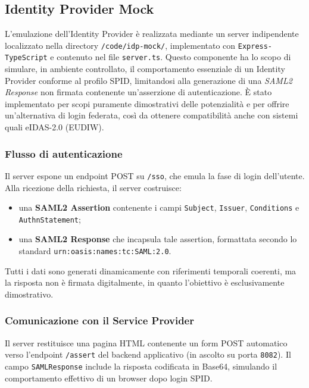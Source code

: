         \subsection{Identity Provider Mock}
            L'emulazione dell’Identity Provider è realizzata mediante un server indipendente localizzato nella directory \lstinline{/code/idp-mock/}, implementato con \texttt{Express-TypeScript} e contenuto nel file \texttt{server.ts}. Questo componente ha lo scopo di simulare, in ambiente controllato, il comportamento essenziale di un Identity Provider conforme al profilo SPID, limitandosi alla generazione di una \textit{SAML2 Response} non firmata contenente un'asserzione di autenticazione.
            È stato implementato per scopi puramente dimostrativi delle potenzialità e per offrire un'alternativa di login federata, così da ottenere compatibilità anche con sistemi quali eIDAS-2.0 (EUDIW).
            
            \subsubsection{Flusso di autenticazione}
                \noindent Il server espone un endpoint POST su \texttt{/sso}, che emula la fase di login dell'utente. Alla ricezione della richiesta, il server costruisce:
                    \begin{itemize}
                        \item una \textbf{SAML2 Assertion} contenente i campi \texttt{Subject}, \texttt{Issuer}, \texttt{Conditions} e \texttt{AuthnStatement};
                        
                        \item una \textbf{SAML2 Response} che incapsula tale assertion, formattata secondo lo standard \texttt{urn:oasis:names:tc:SAML:2.0}.
                    \end{itemize}
            
                \noindent Tutti i dati sono generati dinamicamente con riferimenti temporali coerenti, ma la risposta non è firmata digitalmente, in quanto l'obiettivo è esclusivamente dimostrativo.
            
            \subsubsection{Comunicazione con il Service Provider}
                \noindent Il server restituisce una pagina HTML contenente un form POST automatico verso l'endpoint \texttt{/assert} del backend applicativo (in ascolto su porta \texttt{8082}). Il campo \texttt{SAMLResponse} include la risposta codificata in Base64, simulando il comportamento effettivo di un browser dopo login SPID.
            
